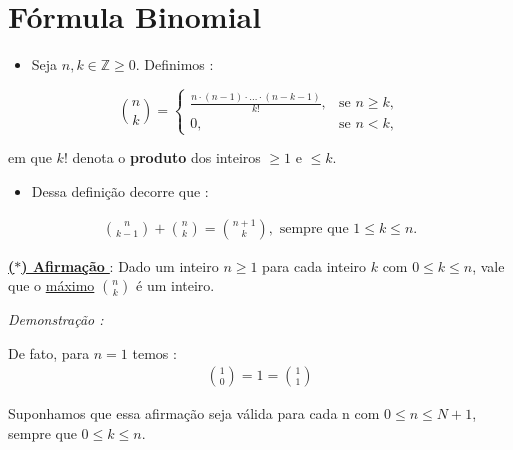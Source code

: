 \section{Fórmula Binomial}

    \begin{definicao}
        \begin{itemize}[left=0.5cm, align=left, nosep]
            \item Seja $n,k \in \mathbb{Z} \ge 0$. Definimos :
        \end{itemize}
        
        \begin{equation*}
            \binom{n}{k} = \begin{cases}\displaystyle
                \frac{n \cdot (n-1) \cdot \dotsc \cdot (n-k-1) }{k!}, & \text{se } n \ge k,\\[6pt] 
                0, & \text{se } n < k,
            \end{cases}        
        \end{equation*}

        \hspace{0.5cm} em que $k!$ denota o \textbf{produto} dos inteiros $\ge 1$ e $\leq k$.

    \end{definicao}
    
    \begin{itemize}[left=0.5cm, align=left, nosep]
        \item Dessa definição decorre que : 
    \end{itemize}

    \vspace{-0.75cm}
    \begin{align*}
        \binom{n}{k-1} + \binom{n}{k} = \binom{n + 1}{k}, \text{ sempre que $1 \leq k \leq n$.}
    \end{align*}

    \underline{\underline{ \textbf{\textcolor{cinzaEscuro}{($\ast$) Afirmação}} }} : Dado um inteiro $n \ge 1$ para cada inteiro $k$
    com $0 \leq k \leq n$, vale que o \underline{máximo} $\binom{n}{k}$ é um inteiro.

    \textit{Demonstração : }

    De fato, para $n=1$ temos :
    \begin{align*}
        \binom{1}{0} = 1 = \binom{1}{1}
    \end{align*}

    Suponhamos que essa afirmação seja válida para cada n com $0 \leq n \leq N+1$, sempre que $0 \leq k \leq n$.

